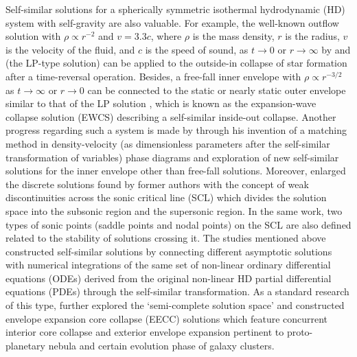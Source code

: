 \documentclass[fleqn,usenatbib]{mnras}
\begin{document}
Self-similar solutions for a spherically symmetric isothermal hydrodynamic (HD) system with self-gravity are also valuable. For example, the well-known outflow solution with $\rho\propto r^{-2}$ and $v=3.3c$, where $\rho$ is the mass density, $r$ is the radius, $v$ is the velocity of the fluid, and $c$ is the speed of sound, as $t\rightarrow 0$ or $r\rightarrow\infty$ by \citet{larson1969numerical} and \citet{penston1969dynamics} (the LP-type solution) can be applied to the outside-in collapse of star formation after a time-reversal operation. Besides, a free-fall inner envelope with $\rho\propto r^{-3/2}$ as $t\rightarrow\infty$ or $r\rightarrow 0$ can be connected to the static or nearly static outer envelope similar to that of the LP solution \citep{shu1977self}, which is known as the expansion-wave collapse solution (EWCS) describing a self-similar inside-out collapse. Another progress regarding such a system is made by \citet{hunter1977collapse} through his invention of a matching method in density-velocity (as dimensionless parameters after the self-similar transformation of variables) phase diagrams and exploration of new self-similar solutions for the inner envelope other than free-fall solutions. Moreover, \citet{whitworth1985self} enlarged the discrete solutions found by former authors with the concept of weak discontinuities across the sonic critical line (SCL) which divides the solution space into the subsonic region and the supersonic region. In the same work, two types of sonic points (saddle points and nodal points) on the SCL are also defined related to the stability of solutions crossing it. The studies mentioned above constructed self-similar solutions by connecting different asymptotic solutions with numerical integrations of the same set of non-linear ordinary differential equations (ODEs) derived from the original non-linear HD partial differential equations (PDEs) through the self-similar transformation. As a standard research of this type, \citet{lou2004envelope} further explored the `semi-complete solution space' and constructed envelope expansion core collapse (EECC) solutions which feature concurrent interior core collapse and exterior envelope expansion pertinent to proto-planetary nebula and certain evolution phase of galaxy clusters.
\end{document}
